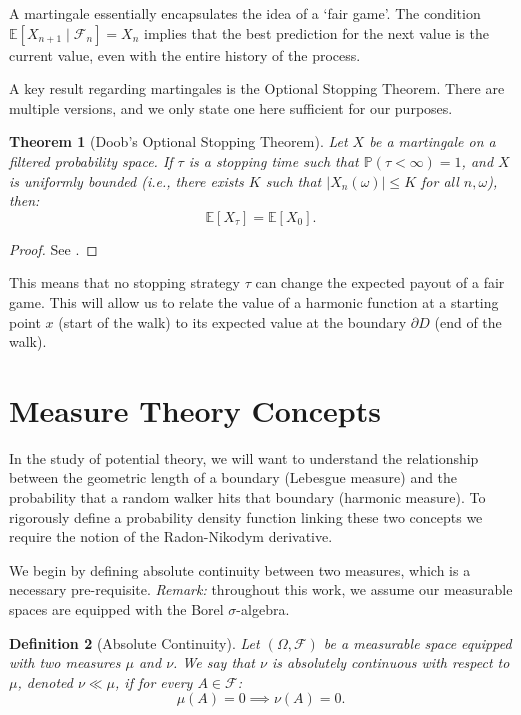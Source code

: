 \documentclass[12pt, a4paper, oneside]{report}
\newtheorem{theorem}{Theorem}[chapter]
\newtheorem{definition}[theorem]{Definition}
\theoremstyle{remark}
\begin{document}
\noindent  A martingale essentially encapsulates the idea of a `fair game'. The condition $\mathbb{E}[X_{n+1} \mid \mathcal{F}_n] = X_n$ implies that the best prediction for the next value is the current value, even with the entire history of the process. 

\noindent A key result regarding martingales is the Optional Stopping Theorem. There are multiple versions, and we only state one here sufficient for our purposes.
\begin{theorem}[Doob's Optional Stopping Theorem]
\label{thm:ost}
    Let $X$ be a martingale on a filtered probability space. If $\tau$ is a stopping time such that $\mathbb{P}(\tau < \infty) = 1$, and $X$ is uniformly bounded (i.e., there exists $K$ such that $|X_n(\omega)| \leq K$ for all $n, \omega$), then:
\begin{equation*}
    \mathbb{E}[X_\tau] = \mathbb{E}[X_0].
\end{equation*}
\end{theorem}

\begin{proof}
See \citet[Section 10.10]{Williams1991}.
\end{proof}

\noindent This means that no stopping strategy $\tau$ can change the expected payout of a fair game. This will allow us to relate the value of a harmonic function at a starting point $x$ (start of the walk) to its expected value at the boundary $\partial D$ (end of the walk).

\section{Measure Theory Concepts}

In the study of potential theory, we will want to understand the relationship between the geometric length of a boundary (Lebesgue measure) and the probability that a random walker hits that boundary (harmonic measure). To rigorously define a probability density function linking these two concepts we require the notion of the Radon-Nikodym derivative.


We begin by defining absolute continuity between two measures, which is a necessary pre-requisite.
\noindent \textit{Remark:} throughout this work, we assume our measurable spaces are equipped with the Borel $\sigma$-algebra.
\begin{definition}[Absolute Continuity]
Let $(\Omega, \mathcal{F})$ be a measurable space equipped with two measures $\mu$ and $\nu$. We say that $\nu$ is absolutely continuous with respect to $\mu$, denoted $\nu \ll \mu$, if for every $A \in \mathcal{F}$:
\begin{equation*}
    \mu(A) = 0 \implies \nu(A) = 0.
\end{equation*}
\end{definition}
\end{document}
